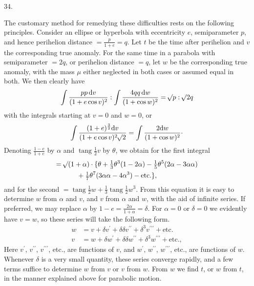 \par{}
\begin{center}
\hypertarget{native-051-article034}{}34.
\end{center}
The customary method for remedying these difficulties rests on the following principles. Consider an ellipse or hyperbola with eccentricity $e$, semiparameter $p$, and hence perihelion distance $=\frac{p}{1+e}=q$. Let $t$ be the time after perihelion and $v$ the corresponding true anomaly. For the same time in a parabola with semiparameter $=2q$, or perihelion distance $=q$, let $w$ be the corresponding true anomaly, with the mass $\mu$ either neglected in both cases or assumed equal in both. We then clearly have
\[
\int\frac{pp\,\mathrm{d}v}{(1+e\cos v)^2}:\int\frac{4qq\,\mathrm{d}w}{(1+\cos w)^2}=\mathord{{}^{}\!\surd}p:\mathord{{}^{}\!\surd}2q
\]
with the integrals starting at $v=0$ and $w=0$, or
\[
\int\frac{(1+e)^{\frac{3}{2}}\mathrm{d}v}{(1+e\cos v)^2\BareRoot{2}}=\int\frac{2\mathrm{d}w}{(1+\cos w)^2}\raisebox{.45ex}{.}
\]
Denoting $\frac{1-e}{1+e}$ by $\alpha$ and $\operatorname{tang}\frac{1}{2}v$ by $\theta$, we obtain for the first integral
\[
\begin{aligned}
={}&\mathord{{}^{}\!\surd}(1+\alpha)\cdot\{\theta+\tfrac{1}{3}\theta^3(1-2\alpha)-\tfrac{1}{5}\theta^5(2\alpha-3\alpha\alpha)\\
&\qquad+\tfrac{1}{7}\theta^7(3\alpha\alpha-4\alpha^3)-\text{etc.}\},
\end{aligned}
\]
and for the second $=\operatorname{tang}\frac{1}{2}w+\frac{1}{3}\operatorname{tang}\frac{1}{2}w^3$. From this equation it is easy to determine $w$ from $\alpha$ and $v$, and $v$ from $\alpha$ and $w$, with the aid of infinite series. If preferred, we may replace $\alpha$ by $1-e=\frac{2\alpha}{1+\alpha}=\delta$. For $\alpha=0$ or $\delta=0$ we evidently have $v=w$, so these series will take the following form.
\[
\begin{aligned}
w&=v+\delta v^{\prime}+\delta\delta v^{\prime\prime}+\delta^3v^{\prime\prime\prime}+\text{etc.}\\
v&=w+\delta w^{\prime}+\delta\delta w^{\prime\prime}+\delta^3w^{\prime\prime\prime}+\text{etc.},
\end{aligned}
\]
Here $v^{\prime}$, $v^{\prime\prime}$, $v^{\prime\prime\prime}$, etc., are functions of $v$, and $w^{\prime}$, $w^{\prime\prime}$, $w^{\prime\prime\prime}$, etc., are functions of $w$. Whenever $\delta$ is a very small quantity, these series converge rapidly, and a few terms suffice to determine $w$ from $v$ or $v$ from $w$. From $w$ we find $t$, or $w$ from $t$, in the manner explained above for parabolic motion.
